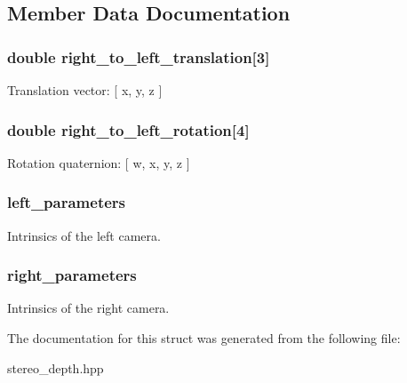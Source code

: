 \subsection{Member Data Documentation}
\hypertarget{structfovis_1_1StereoCalibrationParameters_adc32536cfff16a5a429ee922055e91c7}{
\subsubsection[{right\_\-to\_\-left\_\-translation}]{\setlength{\rightskip}{0pt plus 5cm}double {\bf right\_\-to\_\-left\_\-translation}\mbox{[}3\mbox{]}}}
\label{structfovis_1_1StereoCalibrationParameters_adc32536cfff16a5a429ee922055e91c7}
Translation vector: \mbox{[} x, y, z \mbox{]} \hypertarget{structfovis_1_1StereoCalibrationParameters_ab3132502bb9c8258759a94659881e80c}{
\subsubsection[{right\_\-to\_\-left\_\-rotation}]{\setlength{\rightskip}{0pt plus 5cm}double {\bf right\_\-to\_\-left\_\-rotation}\mbox{[}4\mbox{]}}}
\label{structfovis_1_1StereoCalibrationParameters_ab3132502bb9c8258759a94659881e80c}
Rotation quaternion: \mbox{[} w, x, y, z \mbox{]} \hypertarget{structfovis_1_1StereoCalibrationParameters_ae2daad4ea93156558a55f3fa9a9d26e4}{
\subsubsection[{left\_\-parameters}]{ {\bf left\_\-parameters}}}
\label{structfovis_1_1StereoCalibrationParameters_ae2daad4ea93156558a55f3fa9a9d26e4}
Intrinsics of the left camera. \hypertarget{structfovis_1_1StereoCalibrationParameters_a873ffca7c3cd68f861b010bc7843e219}{
\subsubsection[{right\_\-parameters}]{ {\bf right\_\-parameters}}}
\label{structfovis_1_1StereoCalibrationParameters_a873ffca7c3cd68f861b010bc7843e219}
Intrinsics of the right camera. 

The documentation for this struct was generated from the following file:\begin{DoxyCompactItemize}
\item 
stereo\_\-depth.hpp\end{DoxyCompactItemize}
